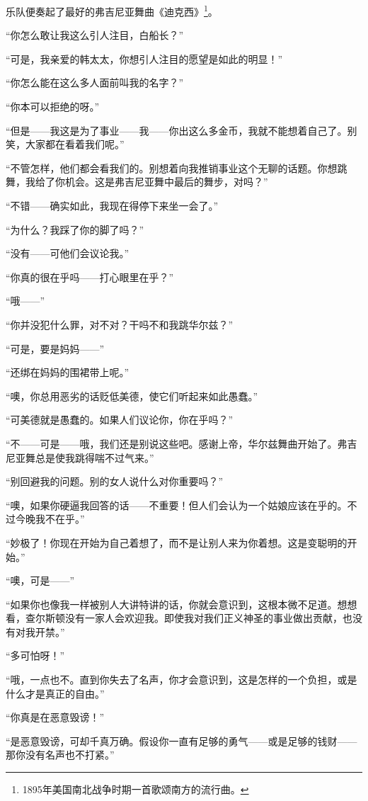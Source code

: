 \par 乐队便奏起了最好的弗吉尼亚舞曲《迪克西》\footnote{1895年美国南北战争时期一首歌颂南方的流行曲。}。
\par “你怎么敢让我这么引人注目，白船长？”
\par “可是，我亲爱的韩太太，你想引人注目的愿望是如此的明显！”
\par “你怎么能在这么多人面前叫我的名字？”
\par “你本可以拒绝的呀。”
\par “但是——我这是为了事业——我——你出这么多金币，我就不能想着自己了。别笑，大家都在看着我们呢。”
\par “不管怎样，他们都会看我们的。别想着向我推销事业这个无聊的话题。你想跳舞，我给了你机会。这是弗吉尼亚舞中最后的舞步，对吗？”
\par “不错——确实如此，我现在得停下来坐一会了。”
\par “为什么？我踩了你的脚了吗？”
\par “没有——可他们会议论我。”
\par “你真的很在乎吗——打心眼里在乎？”
\par “哦——”
\par “你并没犯什么罪，对不对？干吗不和我跳华尔兹？”
\par “可是，要是妈妈——”
\par “还绑在妈妈的围裙带上呢。”
\par “噢，你总用恶劣的话贬低美德，使它们听起来如此愚蠢。”
\par “可美德就是愚蠢的。如果人们议论你，你在乎吗？”
\par “不——可是——哦，我们还是别说这些吧。感谢上帝，华尔兹舞曲开始了。弗吉尼亚舞总是使我跳得喘不过气来。”
\par “别回避我的问题。别的女人说什么对你重要吗？”
\par “噢，如果你硬逼我回答的话——不重要！但人们会认为一个姑娘应该在乎的。不过今晚我不在乎。”
\par “妙极了！你现在开始为自己着想了，而不是让别人来为你着想。这是变聪明的开始。”
\par “噢，可是——”
\par “如果你也像我一样被别人大讲特讲的话，你就会意识到，这根本微不足道。想想看，查尔斯顿没有一家人会欢迎我。即使我对我们正义神圣的事业做出贡献，也没有对我开禁。”
\par “多可怕呀！”
\par “哦，一点也不。直到你失去了名声，你才会意识到，这是怎样的一个负担，或是什么才是真正的自由。”
\par “你真是在恶意毁谤！”
\par “是恶意毁谤，可却千真万确。假设你一直有足够的勇气——或是足够的钱财——那你没有名声也不打紧。”
